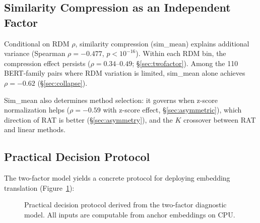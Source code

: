 \documentclass{article}
\begin{document}
\subsection{Similarity Compression as an Independent Factor}
\label{sec:compression_factor}

Conditional on RDM $\rho$, similarity compression (sim\_mean) explains additional variance (Spearman $\rho = -0.477$, $p < 10^{-16}$). Within each RDM bin, the compression effect persists ($\rho = 0.34$--$0.49$; \S\ref{sec:twofactor}). Among the 110 BERT-family pairs where RDM variation is limited, sim\_mean alone achieves $\rho = -0.62$ (\S\ref{sec:collapse}).

Sim\_mean also determines method selection: it governs when z-score normalization helps ($\rho = -0.59$ with z-score effect, \S\ref{sec:asymmetric}), which direction of RAT is better (\S\ref{sec:asymmetry}), and the $K$ crossover between RAT and linear methods.

\subsection{Practical Decision Protocol}
\label{sec:flowchart}

The two-factor model yields a concrete protocol for deploying embedding translation (Figure~\ref{fig:flowchart}):

\begin{figure}[t]
\centering
\small
{}
\caption{Practical decision protocol derived from the two-factor diagnostic model. All inputs are computable from anchor embeddings on CPU.}
\label{fig:flowchart}
\end{figure}
\end{document}
